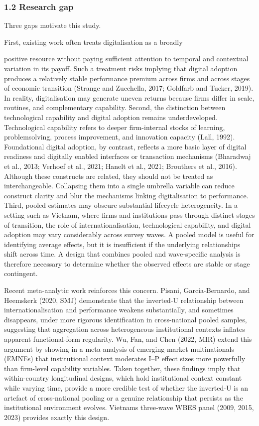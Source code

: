 \documentclass[12pt,a4paper]{article}
\begin{document}
\hypertarget{12-research-gap}{%
\subsubsection{1.2 Research gap}\label{12-research-gap}}

Three gaps motivate this study.

First, existing work often treats digitalisation as a broadly

positive resource without paying sufficient attention to temporal and
contextual variation in its payoff. Such a treatment risks implying that
digital adoption produces a relatively stable performance premium across
firms and across stages of economic transition (Strange and Zucchella,
2017; Goldfarb and Tucker, 2019). In reality, digitalisation may
generate uneven returns because firms differ in scale, routines, and
complementary capability. Second, the distinction between technological
capability and digital adoption remains underdeveloped. Technological
capability refers to deeper firm-internal stocks of learning,
problemsolving, process improvement, and innovation capacity (Lall,
1992). Foundational digital adoption, by contrast, reflects a more basic
layer of digital readiness and digitally enabled interfaces or
transaction mechanisms (Bharadwaj et al., 2013; Verhoef et al., 2021;
Hanelt et al., 2021; Brouthers et al., 2016). Although these constructs
are related, they should not be treated as interchangeable. Collapsing
them into a single umbrella variable can reduce construct clarity and
blur the mechanisms linking digitalisation to performance. Third, pooled
estimates may obscure substantial lifecycle heterogeneity. In a setting
such as Vietnam, where firms and institutions pass through distinct
stages of transition, the role of internationalisation, technological
capability, and digital adoption may vary considerably across survey
waves. A pooled model is useful for identifying average effects, but it
is insufficient if the underlying relationships shift across time. A
design that combines pooled and wave-specific analysis is therefore
necessary to determine whether the observed effects are stable or stage
contingent.

Recent meta-analytic work reinforces this concern. Pisani,
Garcia-Bernardo, and Heemskerk (2020, SMJ) demonstrate that the
inverted-U relationship between internationalisation and performance
weakens substantially, and sometimes disappears, under more rigorous
identification in cross-national pooled samples, suggesting that
aggregation across heterogeneous institutional contexts inflates
apparent functional-form regularity. Wu, Fan, and Chen (2022, MIR)
extend this argument by showing in a meta-analysis of emerging-market
multinationals (EMNEs) that institutional context moderates I--P effect
sizes more powerfully than firm-level capability variables. Taken
together, these findings imply that within-country longitudinal designs,
which hold institutional context constant while varying time, provide a
more credible test of whether the inverted-U is an artefact of
cross-national pooling or a genuine relationship that persists as the
institutional environment evolves. Vietnam\textquotesingle s three-wave
WBES panel (2009, 2015, 2023) provides exactly this design.
\end{document}
